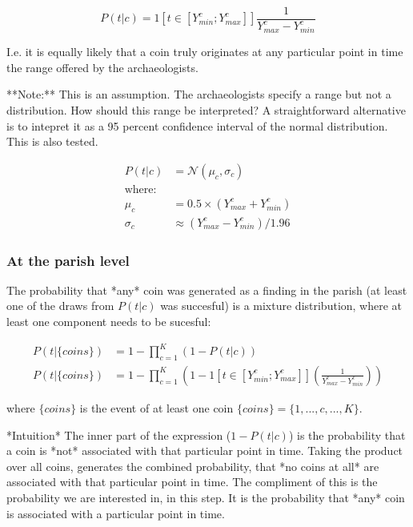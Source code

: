 \begin{equation}
P(t|c)=1[t\in [Y_{min}^c;Y_{max}^c]]\frac{1}{Y_{max}^c - Y_{min}^c}
\end{equation}

I.e. it is equally likely that a coin truly originates at any particular point in time the range offered by the archaeologists. 

**Note:**
This is an assumption. The archaeologists specify a range but not a distribution. How should this range be interpreted? A straightforward alternative is to intepret it as a 95 percent confidence interval of the normal distribution. This is also tested. 

\begin{equation}
\begin{split}
P(t|c)&=\mathcal{N}(\mu_c,\sigma_c)\\
\text{where:} \\
\mu_c&=0.5\times(Y_{max}^c + Y_{min}^c)\\
\sigma_c&\approx(Y_{max}^c - Y_{min}^c)/1.96
\end{split}
\end{equation}

\subsubsection{At the parish level}
The probability that *any* coin was generated as a finding in the parish (at least one of the draws from $P(t|c)$ was succesful) is a mixture distribution, where at least one component needs to be sucesful:

\begin{equation}
\begin{split}
P(t|\{coins\})&=1-\prod_{c=1}^K \left( 1 - P(t|c) \right) \\
P(t|\{coins\})&=1-\prod_{c=1}^K \left(1 - 1[t\in [Y_{min}^c;Y_{max}^c]] \left(\frac{1}{Y_{max}^c - Y_{min}^c}\right) \right)
\end{split}
\end{equation}

where $\{coins\}$ is the event of at least one coin $\{coins\}=\{1,...,c,...,K\}$. 

*Intuition*
The inner part of the expression ($1 - P(t|c)$) is the probability that a coin is *not* associated with that particular point in time. Taking the product over all coins, generates the combined probability, that *no coins at all* are associated with that particular point in time. The compliment of this is the probability we are interested in, in this step. It is the probability that *any* coin is associated with a particular point in time. 

